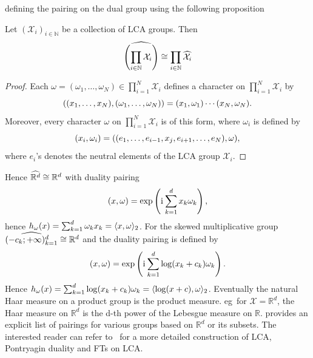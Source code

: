 defining the pairing on the dual group using the following
proposition~\citep{folland1994course}
\begin{proposition}
    Let $(\mathcal{X}_i)_{i\in\mathbb{N}}$ be a collection of \ac{LCA} groups.
    Then
    \begin{dmath*}
        \dual{\left(\prod_{i\in\mathbb{N}} \mathcal{X}_i\right)} \cong
        \prod_{i\in\mathbb{N}} \dual{\mathcal{X}_i}
    \end{dmath*}
\end{proposition}
\begin{proof}
    Each $\omega=(\omega_1, \hdots, \omega_N)\in\prod_{i=1}^N\mathcal{X}_i$
    defines a character on $\prod_{i=1}^N\mathcal{X}_i$ by
    \begin{dmath*}
        \pairing{(x_1, \hdots, x_N),(\omega_1, \hdots,
        \omega_N)}=\pairing{x_1,\omega_1}\cdots\pairing{x_N,\omega_N}.
    \end{dmath*}
    Moreover, every character $\omega$ on $\prod_{i=1}^N\mathcal{X}_i$ is of
    this form, where $\omega_i$ is defined by
    \begin{dmath*}
        \pairing{x_i,\omega_i}=\pairing{(e_1, \hdots, e_{i-1}, x_j, e_{i+1},
        \hdots, e_N), \omega},
    \end{dmath*}
    where $e_i$'s denotes the neutral elements of the \ac{LCA} group
    $\mathcal{X}_i$.
\end{proof}
Hence $\widehat{\mathbb{R}^d}\cong\mathbb{R}^d$ with duality pairing
\begin{dmath*}
    \pairing{x,\omega}=\exp\left(\iu\sum_{k=1}^d x_k\omega_k \right),
\end{dmath*}
hence $h_\omega(x)=\sum_{k=1}^d\omega_k x_k=\langle x,\omega\rangle_2$. For the
skewed multiplicative group $\widehat{(-c_k;+\infty)_{k=1}^d}\cong\mathbb{R}^d$
and the duality pairing is defined by
\begin{dmath*}
    \label{eq:pairing-skewed} \pairing{x, \omega} =
    \exp\left(\iu\sum_{k=1}^d\log(x_k+c_k)\omega_k\right).
\end{dmath*}
Hence $h_\omega(x)=\sum_{k=1}^d
\log(x_k+c_k)\omega_k=\langle\log(x+c),\omega\rangle_2$. Eventually the natural Haar
measure on a product group is the product measure. \acs{eg}~for
$\mathcal{X}=\mathbb{R}^d$, the Haar measure on $\mathbb{R}^d$ is the d-th
power of the Lebesgue measure on $\mathbb{R}$. 
provides an explicit list of pairings for various groups based on
$\mathbb{R}^d$ or its subsets. The interested reader can refer
to~\citet{folland1994course} for a more detailed construction of \ac{LCA},
Pontryagin duality and \acl{FT}s on \ac{LCA}.

